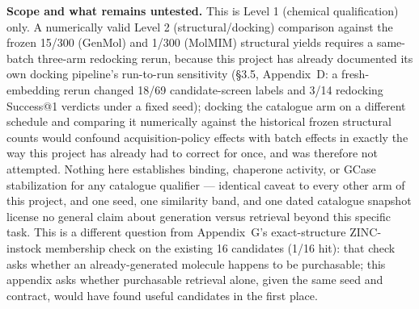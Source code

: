 \documentclass{article}
\begin{document}
\textbf{Scope and what remains untested.} This is Level 1 (chemical qualification) only. A numerically valid Level 2 (structural/docking) comparison against the frozen 15/300 (GenMol) and 1/300 (MolMIM) structural yields requires a same-batch three-arm redocking rerun, because this project has already documented its own docking pipeline's run-to-run sensitivity (\S3.5, Appendix~D: a fresh-embedding rerun changed 18/69 candidate-screen labels and 3/14 redocking Success@1 verdicts under a fixed seed); docking the catalogue arm on a different schedule and comparing it numerically against the historical frozen structural counts would confound acquisition-policy effects with batch effects in exactly the way this project has already had to correct for once, and was therefore not attempted. Nothing here establishes binding, chaperone activity, or GCase stabilization for any catalogue qualifier --- identical caveat to every other arm of this project, and one seed, one similarity band, and one dated catalogue snapshot license no general claim about generation versus retrieval beyond this specific task. This is a different question from Appendix~G's exact-structure ZINC-instock membership check on the existing 16 candidates (1/16 hit): that check asks whether an already-generated molecule happens to be purchasable; this appendix asks whether purchasable retrieval alone, given the same seed and contract, would have found useful candidates in the first place.
\end{document}
